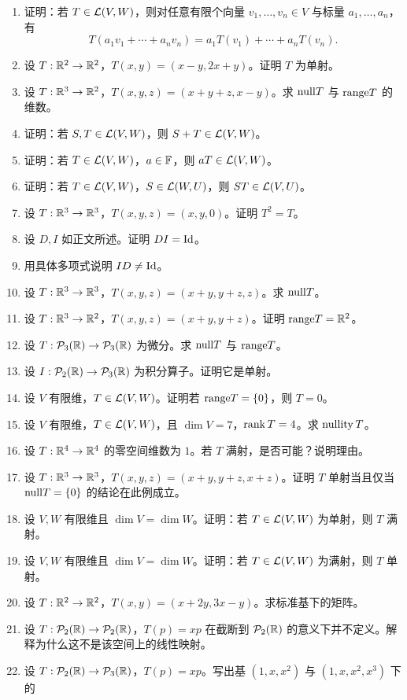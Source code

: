 \begin{enumerate}[label=\medium\ \arabic*., leftmargin=*, start=1] \item 证明：若
$T\in\mathcal{L}(V,W)$，则对任意有限个向量 $v_1,\dots,v_n\in V$ 与标量 $a_1,\dots,a_n$，有 \[
T(a_1v_1+\cdots+a_nv_n)=a_1T(v_1)+\cdots+a_nT(v_n). \] \item 设
$T:\mathbb{R}^2\to\mathbb{R}^2$，$T(x,y)=(x-y,2x+y)$。证明 $T$ 为单射。 \item 设
$T:\mathbb{R}^3\to\mathbb{R}^2$，$T(x,y,z)=(x+y+z,x-y)$。求 $\mathrm{null} T$ 与 $\mathrm{range} T$ 的维数。 \item 证明：若
$S,T\in\mathcal{L}(V,W)$，则 $S+T\in\mathcal{L}(V,W)$。 \item 证明：若 $T\in\mathcal{L}(V,W)$，$a\in\mathbb{F}$，则
$aT\in\mathcal{L}(V,W)$。 \item 证明：若 $T\in\mathcal{L}(V,W)$，$S\in\mathcal{L}(W,U)$，则 $ST\in\mathcal{L}(V,U)$。
\item 设 $T:\mathbb{R}^3\to\mathbb{R}^3$，$T(x,y,z)=(x,y,0)$。证明 $T^2=T$。 \item 设 $D,I$ 如正文所述。证明 $DI=\mathrm{Id}$。
\item 用具体多项式说明 $ID\neq\mathrm{Id}$。 \item 设 $T:\mathbb{R}^3\to\mathbb{R}^3$，$T(x,y,z)=(x+y,y+z,z)$。求 $\mathrm{null} T$。
\item 设 $T:\mathbb{R}^3\to\mathbb{R}^2$，$T(x,y,z)=(x+y,y+z)$。证明 $\mathrm{range} T=\mathbb{R}^2$。 \item 设
$T:\mathcal{P}_3(\mathbb{R})\to\mathcal{P}_3(\mathbb{R})$ 为微分。求 $\mathrm{null} T$ 与 $\mathrm{range} T$。 \item 设
$I:\mathcal{P}_2(\mathbb{R})\to\mathcal{P}_3(\mathbb{R})$ 为积分算子。证明它是单射。 \item 设 $V$ 有限维，$T\in\mathcal{L}(V,W)$。证明若 $\mathrm{range}
T=\{0\}$，则 $T=0$。 \item 设 $V$ 有限维，$T\in\mathcal{L}(V,W)$，且 $\dim V=7$，$\operatorname{rank} T=4$。求 $\operatorname{nullity}
T$。 \item 设 $T:\mathbb{R}^4\to\mathbb{R}^4$ 的零空间维数为 $1$。若 $T$ 满射，是否可能？说明理由。 \item 设
$T:\mathbb{R}^3\to\mathbb{R}^3$，$T(x,y,z)=(x+y,y+z,x+z)$。证明 $T$ 单射当且仅当 $\mathrm{null} T=\{0\}$ 的结论在此例成立。 \item 设
$V,W$ 有限维且 $\dim V=\dim W$。证明：若 $T\in\mathcal{L}(V,W)$ 为单射，则 $T$ 满射。 \item 设 $V,W$ 有限维且 $\dim
V=\dim W$。证明：若 $T\in\mathcal{L}(V,W)$ 为满射，则 $T$ 单射。 \item 设
$T:\mathbb{R}^2\to\mathbb{R}^2$，$T(x,y)=(x+2y,3x-y)$。求标准基下的矩阵。 \item 设
$T:\mathcal{P}_2(\mathbb{R})\to\mathcal{P}_2(\mathbb{R})$，$T(p)=xp$ 在截断到 $\mathcal{P}_2(\mathbb{R})$ 的意义下并不定义。解释为什么这不是该空间上的线性映射。
\item 设 $T:\mathcal{P}_2(\mathbb{R})\to\mathcal{P}_3(\mathbb{R})$，$T(p)=xp$。写出基 $(1,x,x^2)$ 与 $(1,x,x^2,x^3)$ 下的

\end{enumerate}
